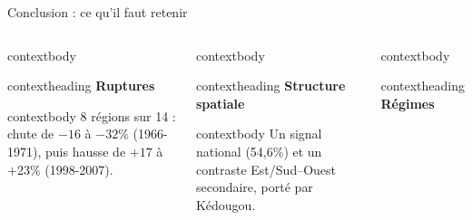 \documentclass[aspectratio=169,11pt]{beamer}
\begin{document}
\begin{frame}{Conclusion : ce qu’il faut retenir}
  \vspace{0.42cm}
  \begin{columns}[T,onlytextwidth]
      \begin{beamercolorbox}[wd=\linewidth,rounded=true,sep=0pt]{contextbody}
        \begin{beamercolorbox}[wd=\linewidth,ht=0.46cm,dp=0.08cm,leftskip=0.14cm]{contextheading}
          \bfseries Ruptures
        \end{beamercolorbox}
        \par\vspace{0.22cm}
        \begin{beamercolorbox}[wd=\linewidth,sep=0.14cm]{contextbody}
          \small
          \vspace*{0.22cm}
          \linespread{1.08}\selectfont
          \textcolor{marine}{8 régions sur 14} : chute de $-16$ à $-32\%$ (1966-1971), puis hausse de $+17$ à $+23\%$ (1998-2007).
        \end{beamercolorbox}
      \end{beamercolorbox}
      \begin{beamercolorbox}[wd=\linewidth,rounded=true,sep=0pt]{contextbody}
        \begin{beamercolorbox}[wd=\linewidth,ht=0.46cm,dp=0.08cm,leftskip=0.14cm]{contextheading}
          \bfseries Structure spatiale
        \end{beamercolorbox}
        \par\vspace{0.22cm}
        \begin{beamercolorbox}[wd=\linewidth,sep=0.14cm]{contextbody}
          \small
          \vspace*{0.22cm}
          \linespread{1.08}\selectfont
          Un signal national (54,6\%) et un contraste Est/Sud--Ouest secondaire, porté par Kédougou.
        \end{beamercolorbox}
      \end{beamercolorbox}
      \begin{beamercolorbox}[wd=\linewidth,rounded=true,sep=0pt]{contextbody}
        \begin{beamercolorbox}[wd=\linewidth,ht=0.46cm,dp=0.08cm,leftskip=0.14cm]{contextheading}
          \bfseries Régimes
        \end{beamercolorbox}

\end{beamercolorbox}
\end{columns}
\end{frame}
\end{document}
